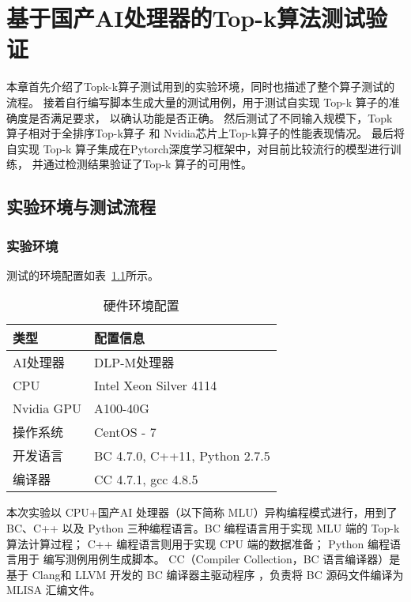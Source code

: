 \chapter{基于国产AI处理器的Top-k算法测试验证}

本章首先介绍了Topk-k算子测试用到的实验环境，同时也描述了整个算子测试的流程。
接着自行编写脚本生成大量的测试用例，用于测试自实现 Top-k 算子的准确度是否满足要求，
以确认功能是否正确。
然后测试了不同输入规模下，Topk 算子相对于全排序Top-k算子 和 Nvidia芯片上Top-k算子的性能表现情况。
最后将自实现
 Top-k 算子集成在Pytorch深度学习框架中，对目前比较流行的模型进行训练，
 并通过检测结果验证了Top-k 算子的可用性。

\section{实验环境与测试流程}
\subsection{实验环境}

测试的环境配置如表~\ref{tab:peizhi}所示。
\begin{table}[h]
    \centering
    \caption{硬件环境配置}
    \begin{tabular}{|l|l|}
    \hline
    类型 & 配置信息 \\
    \hline
    AI处理器 & DLP-M处理器 \\
    \hline
    CPU & Intel Xeon Silver 4114 \\
    \hline
    Nvidia GPU & A100-40G \\
    \hline
    操作系统 & CentOS - 7 \\
    \hline
    开发语言 & BC 4.7.0, C++11, Python 2.7.5 \\
    \hline
    编译器 & CC 4.7.1, gcc 4.8.5 \\
    \hline
    \end{tabular}
    \label{tab:peizhi}
    \end{table}
    
    本次实验以 CPU+国产AI 处理器（以下简称 MLU）异构编程模式进行，用到了BC、C++ 以及 Python 
    三种编程语言。BC 编程语言用于实现 MLU 端的 Top-k 算法计算过程；
    C++ 编程语言则用于实现 CPU 端的数据准备；
    Python 编程语言用于 编写测例用例生成脚本。
    CC（Compiler Collection，BC 语言编译器）是基于 Clang和 LLVM 开发的 BC 编译器主驱动程序
    ，负责将 BC 源码文件编译为 MLISA 汇编文件。
    


